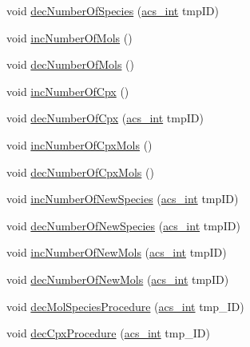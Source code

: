 \begin{DoxyCompactItemize}
\item 
void \hyperlink{classenvironment_a69a926e0b9bb4f4b29876d0e45b54d84}{dec\-Number\-Of\-Species} (\hyperlink{acs__headers_8h_a8d277355641a098190360234e2ebde35}{acs\-\_\-int} tmp\-I\-D)
\item 
void \hyperlink{classenvironment_ae356db3b6ee374b998e9f041216b4b75}{inc\-Number\-Of\-Mols} ()
\item 
void \hyperlink{classenvironment_af042f7904c92fdd239995bebbab2cf60}{dec\-Number\-Of\-Mols} ()
\item 
void \hyperlink{classenvironment_a69ae530ef6f9298e3ab8304157709404}{inc\-Number\-Of\-Cpx} ()
\item 
void \hyperlink{classenvironment_aadd057e7038269e6fac314a12a3bf334}{dec\-Number\-Of\-Cpx} (\hyperlink{acs__headers_8h_a8d277355641a098190360234e2ebde35}{acs\-\_\-int} tmp\-I\-D)
\item 
void \hyperlink{classenvironment_ab101d2158575829ddfe846087040f2fa}{inc\-Number\-Of\-Cpx\-Mols} ()
\item 
void \hyperlink{classenvironment_a756dc43b6b47498ba457613749324b15}{dec\-Number\-Of\-Cpx\-Mols} ()
\item 
void \hyperlink{classenvironment_a1055886a34a9a01ec37db31c69e460e0}{inc\-Number\-Of\-New\-Species} (\hyperlink{acs__headers_8h_a8d277355641a098190360234e2ebde35}{acs\-\_\-int} tmp\-I\-D)
\item 
void \hyperlink{classenvironment_a5fa52a4f8e73a71fa41d3a1641e50535}{dec\-Number\-Of\-New\-Species} (\hyperlink{acs__headers_8h_a8d277355641a098190360234e2ebde35}{acs\-\_\-int} tmp\-I\-D)
\item 
void \hyperlink{classenvironment_a1addb84f0c8d391f97ad2347a64208bb}{inc\-Number\-Of\-New\-Mols} (\hyperlink{acs__headers_8h_a8d277355641a098190360234e2ebde35}{acs\-\_\-int} tmp\-I\-D)
\item 
void \hyperlink{classenvironment_ae9bbd78076706050ced4dd7fb99036f1}{dec\-Number\-Of\-New\-Mols} (\hyperlink{acs__headers_8h_a8d277355641a098190360234e2ebde35}{acs\-\_\-int} tmp\-I\-D)
\item 
void \hyperlink{classenvironment_a10fad450cf5ef3a1c7cf75d616105069}{dec\-Mol\-Species\-Procedure} (\hyperlink{acs__headers_8h_a8d277355641a098190360234e2ebde35}{acs\-\_\-int} tmp\-\_\-\-I\-D)
\item 
void \hyperlink{classenvironment_a16d09f818d3012f88e8e4c9a7759b6bd}{dec\-Cpx\-Procedure} (\hyperlink{acs__headers_8h_a8d277355641a098190360234e2ebde35}{acs\-\_\-int} tmp\-\_\-\-I\-D)
\item 

\end{DoxyCompactItemize}
